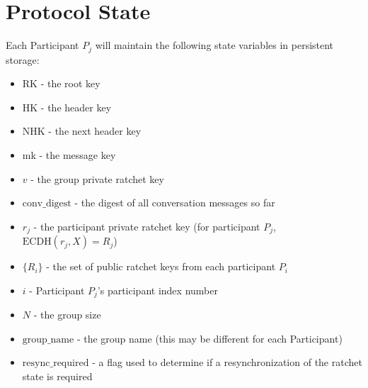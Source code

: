 \documentclass[%
preprint,
amsmath,amssymb,
aps,
prb,
floatfix,
]{revtex4-1}
\begin{document}
\section{\label{sec:protocolstate}Protocol State}
Each Participant $P_j$ will maintain the following state variables in persistent
storage:
\begin{itemize}
\item RK - the root key
\item HK - the header key
\item NHK - the next header key
\item mk - the message key
\item $v$ - the group private ratchet key
\item $\mathrm{conv\_digest}$ - the digest of all conversation messages so far
\item $r_j$ - the participant private ratchet key (for participant $P_j$,
$\mathrm{ECDH}(r_j, X) = R_j$)
\item $\{R_i\}$ - the set of public ratchet keys from each participant $P_i$
\item $i$ - Participant $P_j$'s participant index number
\item $N$ - the group size
\item $\mathrm{group\_name}$ - the group name (this may be different for each Participant)
\item $\mathrm{resync\_required}$ - a flag used to determine if a resynchronization of the
ratchet state is required
\end{itemize}
\end{document}
